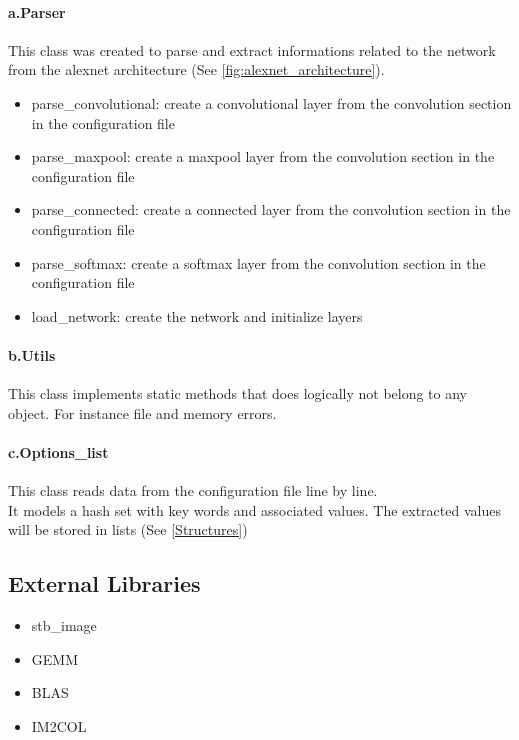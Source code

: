 \documentclass[parskip=full]{scrartcl}
\newcommand\tab[1][1cm]{\hspace*{#1}}
\begin{document}
		\paragraph{a.Parser} \label{Parser}
		\tab This class was created to parse and extract informations related to the network from the alexnet architecture (See \ref{fig:alexnet_architecture}).
		\begin{itemize}
			\item parse\_convolutional: create a convolutional layer from the convolution section in the configuration file
			\item parse\_maxpool: create a maxpool layer from the convolution section in the configuration file
			\item parse\_connected: create a connected layer from the convolution section in the configuration file
			\item parse\_softmax: create a softmax layer from the convolution section in the configuration file
			\item load\_network: create the network and initialize layers
		\end{itemize}
		
		\paragraph{b.Utils}
		\tab This class implements static methods that does logically not belong to any object. For instance file and memory errors. 
		
		\paragraph{c.Options\_list}
		\tab This class reads data from the configuration file line by line.\\
		It models a hash set with key words and associated values. The extracted values will be stored in lists (See \ref{Structures})
		
	\subsection {External Libraries} \label{External Libraries}
		\begin{itemize}
			\item stb\_image
			\item GEMM
			\item BLAS
			\item IM2COL
		\end{itemize}
		
\end{document}
